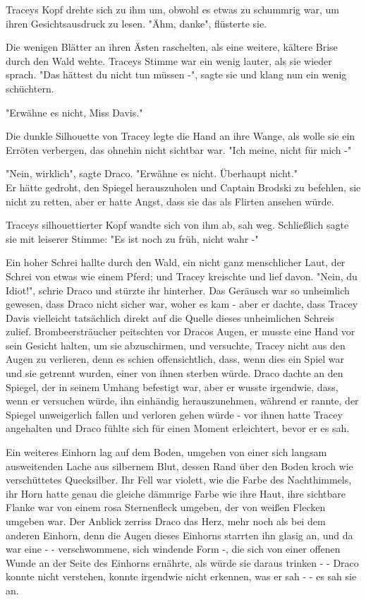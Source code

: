 {Traceys Kopf drehte sich zu ihm um, obwohl es etwas zu schummrig war, um ihren Gesichtsausdruck zu lesen. "Ähm, danke", flüsterte sie.

Die wenigen Blätter an ihren Ästen raschelten, als eine weitere, kältere Brise durch den Wald wehte. Traceys Stimme war ein wenig lauter, als sie wieder sprach. "Das hättest du nicht tun müssen -", sagte sie und klang nun ein wenig schüchtern.

"Erwähne es nicht, Miss Davis."

Die dunkle Silhouette von Tracey legte die Hand an ihre Wange, als wolle sie ein Erröten verbergen, das ohnehin nicht sichtbar war. "Ich meine, nicht für mich -"

"Nein, wirklich", sagte Draco. "Erwähne es nicht. Überhaupt nicht."\\ Er hätte gedroht, den Spiegel herauszuholen und Captain Brodski zu befehlen, sie nicht zu retten, aber er hatte Angst, dass sie das als Flirten ansehen würde.

Traceys silhouettierter Kopf wandte sich von ihm ab, sah weg. Schließlich sagte sie mit leiserer Stimme: "Es ist noch zu früh, nicht wahr -"

Ein hoher Schrei hallte durch den Wald, ein nicht ganz menschlicher Laut, der Schrei von etwas wie einem Pferd; und Tracey kreischte und lief davon. "Nein, du Idiot!", schrie Draco und stürzte ihr hinterher. Das Geräusch war so unheimlich gewesen, dass Draco nicht sicher war, woher es kam - aber er dachte, dass Tracey Davis vielleicht tatsächlich direkt auf die Quelle dieses unheimlichen Schreis zulief. Brombeersträucher peitschten vor Dracos Augen, er musste eine Hand vor sein Gesicht halten, um sie abzuschirmen, und versuchte, Tracey nicht aus den Augen zu verlieren, denn es schien offensichtlich, dass, wenn dies ein Spiel war und sie getrennt wurden, einer von ihnen sterben würde. Draco dachte an den Spiegel, der in seinem Umhang befestigt war, aber er wusste irgendwie, dass, wenn er versuchen würde, ihn einhändig herauszunehmen, während er rannte, der Spiegel unweigerlich fallen und verloren gehen würde - vor ihnen hatte Tracey angehalten und Draco fühlte sich für einen Moment erleichtert, bevor er es sah.

Ein weiteres Einhorn lag auf dem Boden, umgeben von einer sich langsam ausweitenden Lache aus silbernem Blut, dessen Rand über den Boden kroch wie verschüttetes Quecksilber. Ihr Fell war violett, wie die Farbe des Nachthimmels, ihr Horn hatte genau die gleiche dämmrige Farbe wie ihre Haut, ihre sichtbare Flanke war von einem rosa Sternenfleck umgeben, der von weißen Flecken umgeben war. Der Anblick zerriss Draco das Herz, mehr noch als bei dem anderen Einhorn, denn die Augen dieses Einhorns starrten ihn glasig an, und da war eine - - verschwommene, sich windende Form -, die sich von einer offenen Wunde an der Seite des Einhorns ernährte, als würde sie daraus trinken - - Draco konnte nicht verstehen, konnte irgendwie nicht erkennen, was er sah - - es sah sie an.

}
